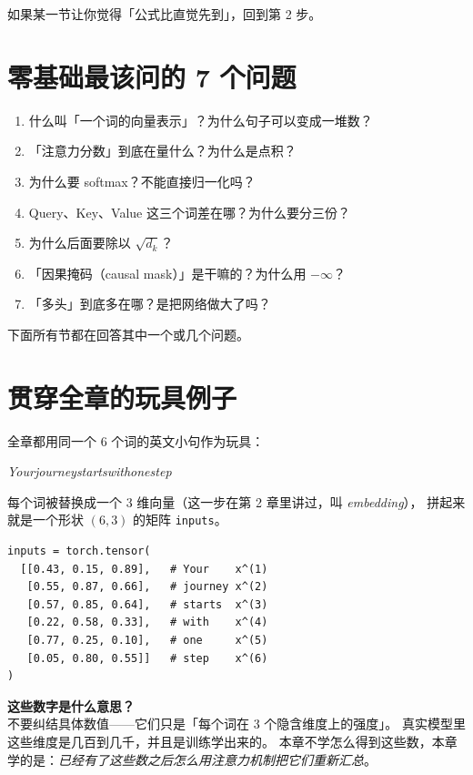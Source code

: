 \documentclass[11pt,a4paper]{ctexart}
\begin{document}
如果某一节让你觉得「公式比直觉先到」，回到第 2 步。

\section{零基础最该问的 7 个问题}

\begin{enumerate}[label=\textbf{Q\arabic*.}]
  \item 什么叫「一个词的向量表示」？为什么句子可以变成一堆数？
  \item 「注意力分数」到底在量什么？为什么是点积？
  \item 为什么要 softmax？不能直接归一化吗？
  \item Query、Key、Value 这三个词差在哪？为什么要分三份？
  \item 为什么后面要除以 $\sqrt{d_k}$？
  \item 「因果掩码（causal mask）」是干嘛的？为什么用 $-\infty$？
  \item 「多头」到底多在哪？是把网络做大了吗？
\end{enumerate}

下面所有节都在回答其中一个或几个问题。

\section{贯穿全章的玩具例子}

\begin{problemblock}
全章都用同一个 6 个词的英文小句作为玩具：

\begin{center}
\textit{Your\quad journey\quad starts\quad with\quad one\quad step}
\end{center}

每个词被替换成一个 3 维向量（这一步在第 2 章里讲过，叫 \emph{embedding}），
拼起来就是一个形状 $(6, 3)$ 的矩阵 \texttt{inputs}。
\end{problemblock}

\begin{codebox}
\begin{lstlisting}
inputs = torch.tensor(
  [[0.43, 0.15, 0.89],   # Your    x^(1)
   [0.55, 0.87, 0.66],   # journey x^(2)
   [0.57, 0.85, 0.64],   # starts  x^(3)
   [0.22, 0.58, 0.33],   # with    x^(4)
   [0.77, 0.25, 0.10],   # one     x^(5)
   [0.05, 0.80, 0.55]]   # step    x^(6)
)
\end{lstlisting}
\end{codebox}

\begin{intuitionblock}
\textbf{这些数字是什么意思？}\\
不要纠结具体数值——它们只是「每个词在 3 个隐含维度上的强度」。
真实模型里这些维度是几百到几千，并且是训练学出来的。
本章不学怎么得到这些数，本章学的是：\emph{已经有了这些数之后怎么用注意力机制把它们重新汇总}。
\end{intuitionblock}
\end{document}
